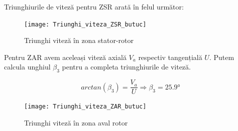 Triunghiurile de viteză pentru ZSR arată în felul următor:

\begin{figure}[h!]
	\centering
	\texttt{[image: Triunghi\_viteza\_ZSR\_butuc]}
	\caption{Triunghi viteză în zona stator-rotor}
	\label{Triunghi viteză în zona stator-rotor}
\end{figure}



Pentru ZAR avem aceleași viteză axială $V_a$ respectiv tangențială $U$. Putem calcula unghiul $\beta_3$ pentru a completa triunghiurile de viteză.

\begin{equation}
arctan(\beta_{3})=\frac{V_{a}}{U} \Rightarrow \beta_{3} =25.9\si{\degree}
\end{equation}

\begin{figure}[h!]
	\centering
	\texttt{[image: Triunghi\_viteza\_ZAR\_butuc]}
	\caption{Triunghi viteză în zona aval rotor}
	\label{Triunghi viteză în zona aval rotor}
\end{figure}

\clearpage

